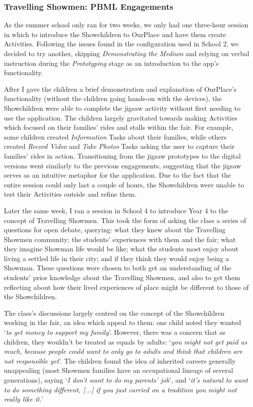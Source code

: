 \subsubsection{Travelling Showmen: PBML Engagements}
As the summer school only ran for two weeks, we only had one three-hour session in which to introduce the Showchildren to OurPlace and have them create Activities. Following the issues found in the configuration used in School 2, we decided to try another, skipping \textit{Demonstrating the Medium} and relying on verbal instruction during the \textit{Prototyping} stage as an introduction to the app's functionality. 

After I gave the children a brief demonstration and explanation of OurPlace's functionality (without the children going hands-on with the devices), the Showchildren were able to complete the jigsaw activity without first needing to use the application. The children largely gravitated towards making Activities which focused on their families' rides and stalls within the fair. For example, some children created \textit{Information} Tasks about their families, while others created \textit{Record Video} and \textit{Take Photos} Tasks asking the user to capture their families' rides in action. Transitioning from the jigsaw prototypes to the digital versions went similarly to the previous engagements, suggesting that the jigsaw serves as an intuitive metaphor for the application. Due to the fact that the entire session could only last a couple of hours, the Showchildren were unable to test their Activities outside and refine them.

Later the same week, I ran a session in School 4 to introduce Year 4 to the concept of Travelling Showmen. This took the form of asking the class a series of questions for open debate, querying: what they knew about the Travelling Showmen community; the students' experiences with them and the fair; what they imagine Showman life would be like; what the students most enjoy about living a settled life in their city; and if they think they would enjoy being a Showman. These questions were chosen to both get an understanding of the students' prior knowledge about the Travelling Showmen, and also to get them reflecting about how their lived experiences of place might be different to those of the Showchildren.

The class's discussions largely centred on the concept of the Showchildren working in the fair, an idea which appeal to them: one child noted they wanted `\textit{to get money to support my family}'. However, there was a concern that as children, they wouldn't be treated as equals by adults: `\textit{you might not get paid as much, because people could want to only go to adults and think that children are not responsible yet}'. The children found the idea of inherited careers generally unappealing (most Showmen families have an occupational lineage of several generations), saying `\textit{I don't want to do my parents' job}', and `\textit{it's natural to want to do something different, [...] if you just carried on a tradition you might not really like it.}' 

